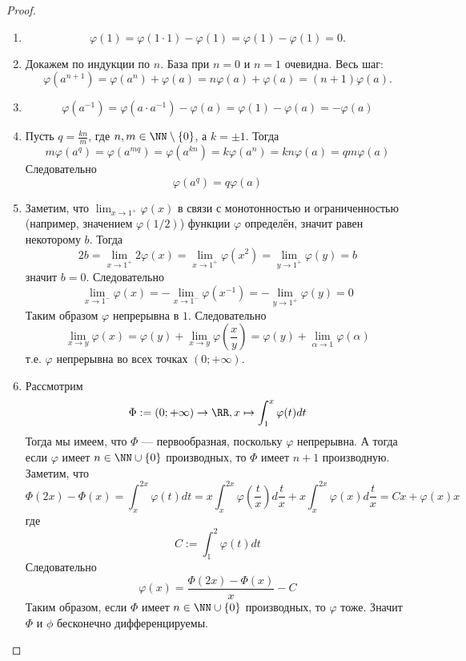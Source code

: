 \documentclass[12pt,a4paper]{article}
\begin{document}
    \begin{proof}\ 
        \begin{enumerate}
            \item \[\varphi(1) = \varphi(1 \cdot 1) - \varphi(1) = \varphi(1) - \varphi(1) = 0.\]

            \item Докажем по индукции по $n$. База при $n=0$ и $n=1$ очевидна. Весь шаг:
                \[\varphi(a^{n+1}) = \varphi(a^n) + \varphi(a) = n\varphi(a) + \varphi(a) = (n+1)\varphi(a).\]

            \item \[\varphi(a^{-1}) = \varphi(a \cdot a^{-1}) - \varphi(a) = \varphi(1) - \varphi(a) = -\varphi(a)\]

            \item Пусть $q = \frac{kn}{m}$, где $n, m \in \NN \setminus \{0\}$, а $k = \pm 1$. Тогда
                \[m\varphi(a^q) = \varphi(a^{mq}) = \varphi(a^{kn}) = k\varphi(a^n) = kn\varphi(a) = qm\varphi(a)\]
                Следовательно
                \[\varphi(a^q) = q\varphi(a)\]

            \item Заметим, что $\lim_{x \to 1^+} \varphi(x)$ в связи с монотонностью и ограниченностью (например, значением $\varphi(1/2)$) функции $\varphi$ определён, значит равен некоторому $b$. Тогда
                \[2b = \lim_{x \to 1^+} 2\varphi(x) = \lim_{x \to 1^+} \varphi(x^2) = \lim_{y \to 1^+} \varphi(y) = b\]
                значит $b = 0$. Следовательно
                \[\lim_{x \to 1^-} \varphi(x) = - \lim_{x \to 1^-} \varphi(x^{-1}) = - \lim_{y \to 1^+} \varphi(y) = 0\]
                Таким образом $\varphi$ непрерывна в $1$. Следовательно
                \[\lim_{x \to y} \varphi(x) = \varphi(y) + \lim_{x \to y} \varphi\left(\frac{x}{y}\right) = \varphi(y) + \lim_{\alpha \to 1} \varphi(\alpha)\]
                т.е. $\varphi$ непрерывна во всех точках $(0; +\infty)$.

            \item Рассмотрим
                \[\Phi := (0; +\infty) \to \RR, x \mapsto \int_1^x \varphi(t)dt\]
                Тогда мы имеем, что $\Phi$ --- первообразная, поскольку $\varphi$ непрерывна. А тогда если $\varphi$ имеет $n \in \NN \cup \{0\}$ производных, то $\Phi$ имеет $n+1$ производную. Заметим, что
                \[
                    \Phi(2x) - \Phi(x)
                    = \int_x^{2x}\varphi(t)dt
                    = x\int_x^{2x}\varphi\left(\frac{t}{x}\right)d\frac{t}{x} + x\int_x^{2x}\varphi(x)d\frac{t}{x}
                    = Cx + \varphi(x)x
                \]
                где
                \[C := \int_1^2 \varphi(t)dt\]
                Следовательно
                \[\varphi(x) = \frac{\Phi(2x) - \Phi(x)}{x} - C\]
                Таким образом, если $\Phi$ имеет $n \in \NN \cup \{0\}$ производных, то $\varphi$ тоже. Значит $\Phi$ и $\phi$ бесконечно дифференцируемы.


\end{enumerate}
\end{proof}
\end{document}
